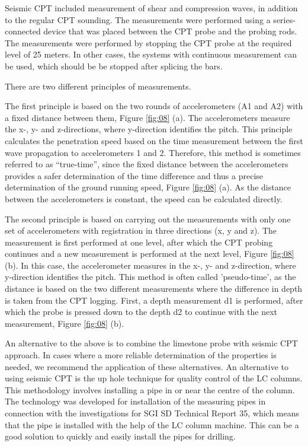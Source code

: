 \documentclass[final,3p,times,onecolumn,authoryear]{elsarticle}
\begin{document}
Seismic CPT included measurement of shear and compression waves, in addition to the regular CPT sounding. The measurements were performed using a series-connected device that was placed between the CPT probe and the probing rods. The measurements were performed by stopping the CPT probe at the required level of 25 meters. In other cases, the systems with continuous measurement can be used, which should be be stopped after splicing the bars.

There are two different principles of measurements.

The first principle is based on the two rounds of accelerometers (A1 and A2) with a fixed distance between them, Figure \ref{fig:08} (a). The accelerometers measure the x-, y- and z-directions, where y-direction identifies the pitch. This principle calculates the penetration speed based on the time measurement between the first wave propagation to accelerometers 1 and 2. Therefore, this method is sometimes referred to as “true-time”, since the fixed distance between the accelerometers provides a safer determination of the time difference and thus a precise determination of the ground running speed, Figure \ref{fig:08} (a). 
As the distance between the accelerometers is constant, the speed can be calculated directly.

The second principle is based on carrying out the measurements with only one set of accelerometers with registration in three directions (x, y and z). The measurement is first performed at one level, after which the CPT probing continues and a new measurement is performed at the next level, Figure \ref{fig:08} (b). In this case, the accelerometer measures in the x-, y- and z-direction, where y-direction identifies the pitch. This method is often called 'pseudo-time', as the distance is based on the two different measurements where the difference in depth is taken from the CPT logging. First, a depth measurement d1 is performed, after which the probe is pressed down to the depth d2 to continue with the next measurement, Figure \ref{fig:08} (b).

An alternative to the above is to combine the limestone probe with seismic CPT approach. In cases where a more reliable determination of the properties is needed, we recommend the application of these alternatives. An alternative to using seismic CPT is the up hole technique for quality control of the LC columns. This methodology involves installing a pipe in or near the centre of the column. The technology was developed for installation of the measuring pipes in connection with the investigations for SGI SD Technical Report 35, which means that the pipe is installed with the help of the LC column machine. This can be a good solution to quickly and easily install the pipes for drilling. 
\end{document}
